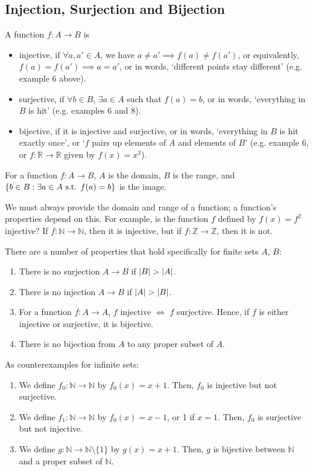 \subsection{Injection, Surjection and Bijection}
\begin{definition}
	A function \(f\colon A \to B\) is
	\begin{itemize}
		\item injective, if \(\forall a, a' \in A\), we have \(a \neq a' \implies f(a) \neq f(a')\), or equivalently, \(f(a) = f(a') \implies a = a'\), or in words, `different points stay different' (e.g.
		      example 6 above).
		\item surjective, if \(\forall b \in B\), \(\exists a \in A\) such that \(f(a) = b\), or in words, `everything in \(B\) is hit' (e.g.
		      examples 6 and 8).
		\item bijective, if it is injective and surjective, or in words, `everything in \(B\) is hit exactly once', or `\(f\) pairs up elements of \(A\) and elements of \(B\)' (e.g.
		      example 6, or \(f\colon \mathbb R \to \mathbb R\) given by \(f(x) = x^3\)).
	\end{itemize}
\end{definition}
\begin{definition}
	For a function \(f\colon A \to B\), \(A\) is the domain, \(B\) is the range, and \(\{ b \in B : \exists a \in A \text{ s.t. } f(a) = b \}\) is the image.
\end{definition}
We must always provide the domain and range of a function; a function's properties depend on this.
For example, is the function \(f\) defined by \(f(x) = f^2\) injective?
If \(f\colon \mathbb N \to \mathbb N\), then it is injective, but if \(f\colon \mathbb Z \to \mathbb Z\), then it is not.

There are a number of properties that hold specifically for finite sets \(A\), \(B\):
\begin{enumerate}
	\item There is no surjection \(A \to B\) if \(\abs{B} > \abs{A}\).
	\item There is no injection \(A \to B\) if \(\abs{A} > \abs{B}\).
	\item For a function \(f\colon A \to A\), \(f\) injective \(\iff\) \(f\) surjective.
	      Hence, if \(f\) is either injective or surjective, it is bijective.
	\item There is no bijection from \(A\) to any proper subset of \(A\).
\end{enumerate}
As counterexamples for infinite sets:
\begin{enumerate}
	\item We define \(f_0\colon \mathbb N \to \mathbb N\) by \(f_0(x) = x+1\).
	      Then, \(f_0\) is injective but not surjective.
	\item We define \(f_1\colon \mathbb N \to \mathbb N\) by \(f_0(x) = x-1\), or 1 if \(x=1\).
	      Then, \(f_0\) is surjective but not injective.
	\item We define \(g\colon \mathbb N \to \mathbb N \setminus \{ 1 \}\) by \(g(x) = x+1\).
	      Then, \(g\) is bijective between \(\mathbb N\) and a proper subset of \(\mathbb N\).
\end{enumerate}


